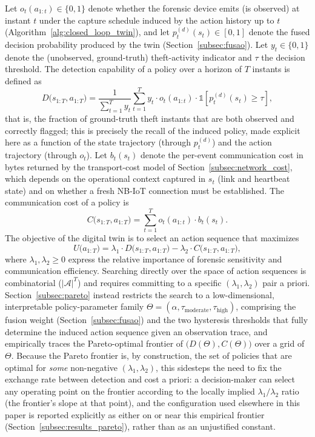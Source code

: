 \documentclass{ieeeaccess}
\begin{document}
Let $o_t(a_{1:t}) \in \{0,1\}$ denote whether the forensic device emits (is observed) at instant $t$ under the capture schedule induced by the action history up to $t$ (Algorithm~\ref{alg:closed_loop_twin}), and let $p_t^{(d)}(s_t) \in [0,1]$ denote the fused decision probability produced by the twin (Section~\ref{subsec:fusao}). Let $y_t \in \{0,1\}$ denote the (unobserved, ground-truth) theft-activity indicator and $\tau$ the decision threshold. The detection capability of a policy over a horizon of $T$ instants is defined as
\begin{equation}
D\big(s_{1:T}, a_{1:T}\big) = \frac{1}{\sum_{t=1}^{T} y_t} \sum_{t=1}^{T} y_t \cdot o_t(a_{1:t}) \cdot \mathbb{1}\!\left[p_t^{(d)}(s_t) \geq \tau\right],
\label{eq:detection_capability}
\end{equation}
that is, the fraction of ground-truth theft instants that are both observed and correctly flagged; this is precisely the recall of the induced policy, made explicit here as a function of the state trajectory (through $p_t^{(d)}$) and the action trajectory (through $o_t$). Let $b_t(s_t)$ denote the per-event communication cost in bytes returned by the transport-cost model of Section~\ref{subsec:network_cost}, which depends on the operational context captured in $s_t$ (link and heartbeat state) and on whether a fresh NB-IoT connection must be established. The communication cost of a policy is
\begin{equation}
C\big(s_{1:T}, a_{1:T}\big) = \sum_{t=1}^{T} o_t(a_{1:t}) \cdot b_t(s_t).
\label{eq:communication_cost}
\end{equation}
The objective of the digital twin is to select an action sequence that maximizes
\begin{equation}
U\big(a_{1:T}\big) = \lambda_1 \cdot D\big(s_{1:T}, a_{1:T}\big) - \lambda_2 \cdot C\big(s_{1:T}, a_{1:T}\big),
\label{eq:utility}
\end{equation}
where $\lambda_1, \lambda_2 \geq 0$ express the relative importance of forensic sensitivity and communication efficiency. Searching directly over the space of action sequences is combinatorial ($|\mathcal{A}|^T$) and requires committing to a specific $(\lambda_1, \lambda_2)$ pair a priori. Section~\ref{subsec:pareto} instead restricts the search to a low-dimensional, interpretable policy-parameter family $\Theta = (\alpha, \tau_{\text{moderate}}, \tau_{\text{high}})$, comprising the fusion weight (Section~\ref{subsec:fusao}) and the two hysteresis thresholds that fully determine the induced action sequence given an observation trace, and empirically traces the Pareto-optimal frontier of $\big(D(\Theta), C(\Theta)\big)$ over a grid of $\Theta$. Because the Pareto frontier is, by construction, the set of policies that are optimal for \emph{some} non-negative $(\lambda_1, \lambda_2)$, this sidesteps the need to fix the exchange rate between detection and cost a priori: a decision-maker can select any operating point on the frontier according to the locally implied $\lambda_1/\lambda_2$ ratio (the frontier's slope at that point), and the configuration used elsewhere in this paper is reported explicitly as either on or near this empirical frontier (Section~\ref{subsec:results_pareto}), rather than as an unjustified constant.
\end{document}
